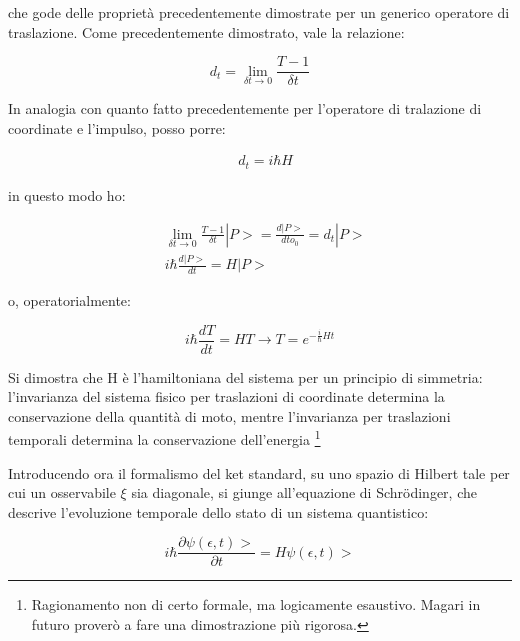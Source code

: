 \documentclass{article}
\begin{document}
che gode delle proprietà precedentemente dimostrate per un generico operatore di traslazione.
Come precedentemente dimostrato, vale la relazione:

\begin{equation}
    d_t= \lim_{\delta t \rightarrow 0} \frac{T-1}{\delta t}
\end{equation}

In analogia con quanto fatto precedentemente per l'operatore di tralazione di coordinate e l'impulso, posso porre:

\begin{equation}
    \begin{aligned}
         & d_t= i\hbar H
    \end{aligned}
\end{equation}

in questo modo ho:

\begin{equation}
    \begin{aligned}
         & \lim_{\delta t \rightarrow 0} \frac{T-1}{\delta t}|P>= \frac{d |P>}{d to_0}= d_t |P> \\
         & i\hbar \frac{d |P>}{dt}= H|P>
    \end{aligned}
\end{equation}

o, operatorialmente:

\begin{equation}
    i\hbar \frac{d T}{dt}= HT \rightarrow T=e^{-\frac{i}{\hbar}Ht}
\end{equation}

Si dimostra che H è l'hamiltoniana del sistema per un principio di simmetria:
l'invarianza del sistema fisico per traslazioni di coordinate determina la conservazione della quantità di moto,
mentre l'invarianza per traslazioni temporali determina la conservazione dell'energia \footnote{
    Ragionamento non di certo formale, ma logicamente esaustivo. Magari in futuro proverò a fare una dimostrazione
    più rigorosa.
}

Introducendo ora il formalismo del ket standard, su uno spazio di Hilbert tale per cui un osservabile $\xi$ sia diagonale,
si giunge all'equazione di Schrödinger, che descrive l'evoluzione temporale dello stato di un sistema quantistico:

\begin{equation}
    i\hbar \frac{\partial \psi(\epsilon,t)>}{\partial t}= H\psi(\epsilon,t)>
\end{equation}
\end{document}
